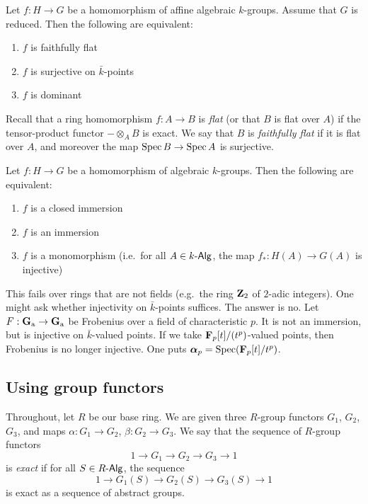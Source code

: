 \begin{prop}
Let $f:H\to G$ be a homomorphism of affine algebraic $k$-groups. Assume that 
$G$ is reduced. Then the following are equivalent:
\begin{enumerate}
  \item $f$ is faithfully flat
  \item $f$ is surjective on $\bar k$-points
  \item $f$ is dominant 
\end{enumerate}
\end{prop}

Recall that a ring homomorphism $f:A\to B$ is \emph{flat} (or that $B$ is flat 
over $A$) if the tensor-product functor $-\otimes_A B$ is exact. We say that $B$ 
is \emph{faithfully flat} if it is flat over $A$, and moreover the map 
$\operatorname{Spec} B \to \operatorname{Spec} A$ is surjective. 

\begin{prop}
Let $f:H\to G$ be a homomorphism of algebraic $k$-groups. Then the following are 
equivalent: 
\begin{enumerate}
  \item $f$ is a closed immersion
  \item $f$ is an immersion 
  \item $f$ is a monomorphism (i.e.\ for all $A\in k\text{-}\mathsf{Alg}$, the map 
    $f_\ast:H(A) \to G(A)$ is injective)
\end{enumerate}
\end{prop}

This fails over rings that are not fields (e.g.\ the ring $\mathbf{Z}_2$ of $2$-adic 
integers). One might ask whether injectivity on $\bar k$-points suffices. The 
answer is no. Let $F:\mathbf{G}_{\mathrm{a}} \to \mathbf{G}_{\mathrm{a}}$ be Frobenius over a field 
of characteristic $p$. It is not an immersion, but is injective on 
$\bar k$-valued points. If we take $\mathbf{F}_p[t]/(t^p)$-valued points, then 
Frobenius is no longer injective. One puts 
$\boldsymbol\alpha_p = \operatorname{Spec}(\mathbf{F}_p[t]/t^p)$. 





\subsection{Using group functors}

Throughout, let $R$ be our base ring. We are given three $R$-group functors 
$G_1$, $G_2$, $G_3$, and maps 
$\alpha:G_1 \to G_2$, $\beta:G_2 \to G_3$. We say that the sequence of $R$-group 
functors 
\[
  1 \to G_1 \to G_2 \to G_3 \to 1 
\]
is \emph{exact} if for all $S\in R\text{-}\mathsf{Alg}$, the sequence 
\[
  1 \to G_1(S) \to G_2(S) \to G_3(S) \to 1 
\]
is exact as a sequence of abstract groups. 

